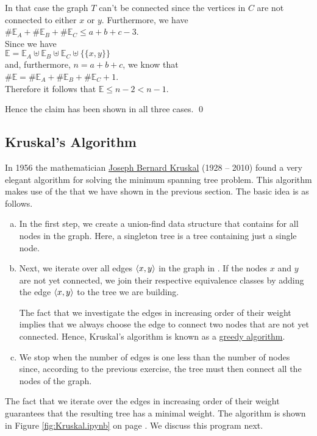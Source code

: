 \begin{enumerate}
\begin{enumerate}
    In that case the graph $T$ can't be connected since the vertices in $C$ are not connected to either $x$ or
    $y$.  Furthermore, we have
    \\[0.2cm]
    \hspace*{1.3cm}
    $\# \mathbb{E}_A + \# \mathbb{E}_B + \# \mathbb{E}_C \leq a + b + c - 3$.
    \\[0.2cm]
    Since we have
    \\[0.2cm]
    \hspace*{1.3cm}
    $\mathbb{E} = \mathbb{E}_A \uplus \mathbb{E}_B \uplus \mathbb{E}_C \uplus \bigl\{\{x,y\}\bigr\}$
    \\[0.2cm]
    and, furthermore, $n = a + b + c$, we know that
    \\[0.2cm]
    \hspace*{1.3cm}
    $\#\mathbb{E} = \#\mathbb{E}_A + \#\mathbb{E}_B + \#\mathbb{E}_C + 1$.
    \\[0.2cm]
    Therefore it follows that $\mathbb{E} \leq n - 2 < n - 1$. \green{$\surd$}
  \end{enumerate}
  Hence the claim has been shown in all three cases. \qed
\end{enumerate} 

\subsection{Kruskal's Algorithm}
In 1956 the mathematician \href{https://en.wikipedia.org/wiki/Joseph_Kruskal}{Joseph Bernard Kruskal} (1928 -- 2010) 
found a very elegant algorithm for solving the minimum spanning tree problem.   This algorithm makes use
of the  that we have shown in the previous section.  The basic idea is as
follows.
\begin{enumerate}[(a)]
\item In the first step, we create a union-find data structure that contains 
      for all nodes in the graph.  Here, a singleton tree is a tree containing just a single node.
\item Next, we iterate over all edges $\pair(x, y)$ in the graph in .
      If the nodes $x$ and $y$ are not yet connected, we join their respective equivalence classes by adding
      the edge $\pair(x, y)$ to the tree we are building.

      The fact that we investigate the edges in increasing order of their weight implies that we always choose
      the  edge to connect two nodes that are not yet connected.  Hence, Kruskal's algorithm is
      known as a \href{https://en.wikipedia.org/wiki/Greedy_algorithm}{greedy algorithm}.
\item We stop when the number of edges is one less than the number of nodes since, according to the
      previous exercise, the tree must then connect all the nodes of the graph. 
\end{enumerate}
The fact that we iterate over the edges in increasing order of their weight guarantees that the
resulting tree has a minimal weight.
The algorithm is shown in Figure \ref{fig:Kruskal.ipynb} on page \pageref{fig:Kruskal.ipynb}.  We
discuss this program next.

